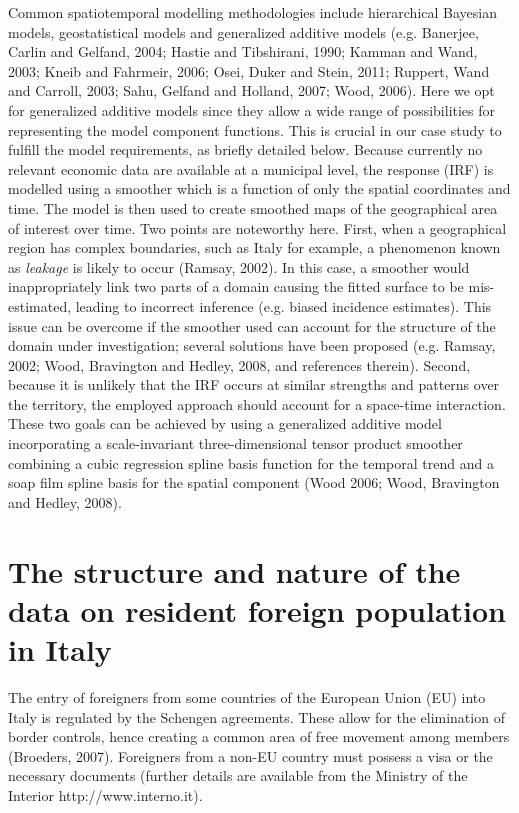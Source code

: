 \documentclass[12pt]{article}
\theoremstyle{definition}
\theoremstyle{plain}
\begin{document}
Common spatiotemporal modelling methodologies include hierarchical Bayesian models, geostatistical models and generalized additive models (e.g. Banerjee, Carlin and Gelfand, 2004; Hastie and Tibshirani, 1990; Kamman and Wand, 2003; Kneib and Fahrmeir, 2006; Osei, Duker and Stein, 2011; Ruppert, Wand and Carroll, 2003; Sahu, Gelfand and Holland, 2007; Wood, 2006). Here we opt for generalized additive models since they allow a wide range of possibilities for representing the model component functions. This is crucial in our case study to fulfill the model requirements, as briefly detailed below. Because currently no relevant economic data are available at a municipal level, the response (IRF) is modelled using a smoother which is a function of only the spatial coordinates and time. The model is then used to create smoothed maps of the geographical area of interest over time. Two points are noteworthy here. First, when a geographical region has complex boundaries, such as Italy for example, a phenomenon known as \textit{leakage} is likely to occur (Ramsay, 2002). In this case, a smoother would inappropriately link two parts of a domain causing the fitted surface to be mis-estimated, leading to incorrect inference (e.g. biased incidence estimates). This issue can be overcome if the smoother used can account for the structure of the domain under investigation; several solutions have been proposed (e.g. Ramsay, 2002; Wood, Bravington and Hedley, 2008, and references therein). Second, because it is unlikely that the IRF occurs at similar strengths and patterns over the territory, the employed approach should account for a space-time interaction. These two goals can be achieved by using a generalized additive model incorporating a scale-invariant three-dimensional tensor product smoother combining a cubic regression spline basis function for the temporal trend and a soap film spline basis for the spatial component (Wood 2006; Wood, Bravington and Hedley, 2008).


\section{The structure and nature of the data on resident foreign population in Italy\label{SDC}}

The entry of foreigners from some countries of the European Union (EU) into Italy is regulated by the Schengen agreements. These allow for the elimination of border controls, hence creating a common area of free movement among members (Broeders, 2007). Foreigners from a non-EU country must possess a visa or the necessary documents (further details are available from the Ministry of the Interior http://www.interno.it). 
 
\end{document}
